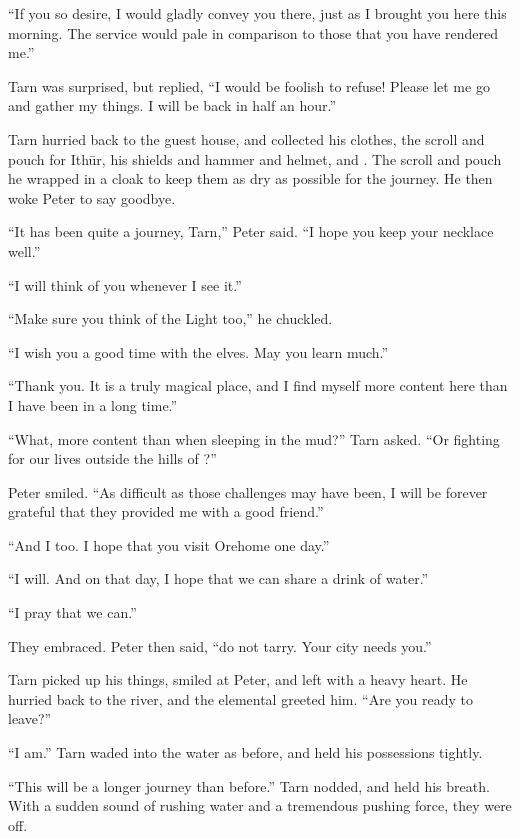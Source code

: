 ``If you so desire, I would gladly convey you there, just as I brought you here this morning.  The service would pale in comparison to those that you have rendered me.''

Tarn was surprised, but replied, ``I would be foolish to refuse!  Please let me go and gather my things.  I will be back in half an hour.''

Tarn hurried back to the guest house, and collected his clothes, the scroll and pouch for Ith\=ur, his shields and hammer and helmet, and \kildir.  The scroll and pouch he wrapped in a cloak to keep them as dry as possible for the journey.  He then woke Peter to say goodbye.

``It has been quite a journey, Tarn,'' Peter said.  ``I hope you keep your necklace well.''

``I will think of you whenever I see it.''

``Make sure you think of the Light too,'' he chuckled.

``I wish you a good time with the elves.  May you learn much.''

``Thank you. It is a truly magical place, and I find myself more content here than I have been in a long time.''

``What, more content than when sleeping in the mud?'' Tarn asked.  ``Or fighting for our lives outside the hills of \tholkunrond?''

Peter smiled.  ``As difficult as those challenges may have been, I will be forever grateful that they provided me with a good friend.''

``And I too.  I hope that you visit Orehome one day.''

``I will.  And on that day, I hope that we can share a drink of water.''

``I pray that we can.''

They embraced.  Peter then said, ``do not tarry.  Your city needs you.''

Tarn picked up his things, smiled at Peter, and left with a heavy heart.  He hurried back to the river, and the elemental greeted him.  ``Are you ready to leave?''

``I am.''  Tarn waded into the water as before, and held his possessions tightly.

``This will be a longer journey than before.''  Tarn nodded, and held his breath.  With a sudden sound of rushing water and a tremendous pushing force, they were off.

